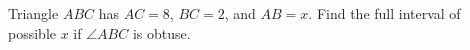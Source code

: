 Triangle $ABC$ has $AC=8$, $BC=2$, and $AB=x$. Find the full interval of possible $x$ if $\angle ABC$ is obtuse.
